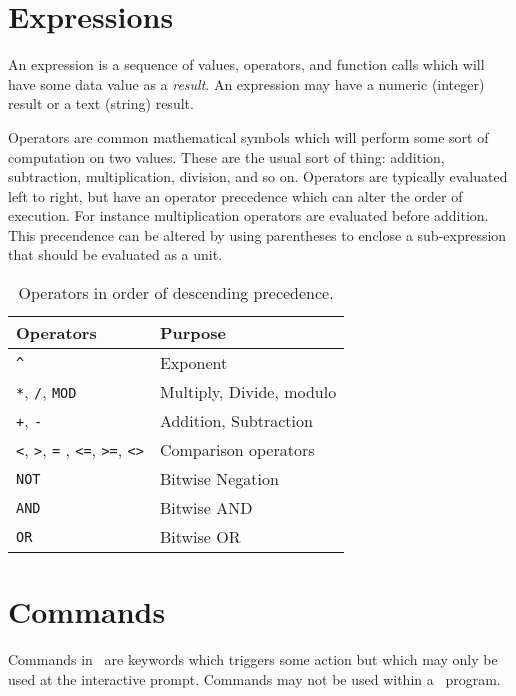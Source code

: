 \documentclass{report}
\begin{document}
    \section*{Expressions}

    An expression is a sequence of values, operators, and function calls which will have some data value as a {\em result}.
    An expression may have a numeric (integer) result or a text (string) result.

    Operators are common mathematical symbols which will perform some sort of computation on two values. These are the usual
    sort of thing: addition, subtraction, multiplication, division, and so on. Operators are typically evaluated left to right,
    but have an operator precedence which can alter the order of execution. For instance multiplication operators are evaluated
    before addition. This precendence can be altered by using parentheses to enclose a sub-expression that should be evaluated
    as a unit.

    \begin{table}
        \begin{tabular}{|l|l|} \hline
            Operators & Purpose \\ \hline\hline
            \verb+^+ & Exponent \\ \hline
            \verb+*+, \verb+/+, \verb+MOD+ & Multiply, Divide, modulo \\ \hline
            \verb-+-, \verb+-+ & Addition, Subtraction \\ \hline
            \verb+<+, \verb+>+, \verb+=+ , \verb+<=+, \verb+>=+, \verb+<>+ & Comparison operators \\ \hline
            \verb+NOT+ & Bitwise Negation \\ \hline
            \verb+AND+ & Bitwise AND \\ \hline
            \verb+OR+ & Bitwise OR \\ \hline
        \end{tabular}
        \caption{Operators in order of descending precedence.}
    \end{table}

    \section*{Commands}

    Commands in \BASIC\ are keywords which triggers some action but which may only be used at the interactive prompt.
    Commands may not be used within a \BASIC\ program.
\end{document}
